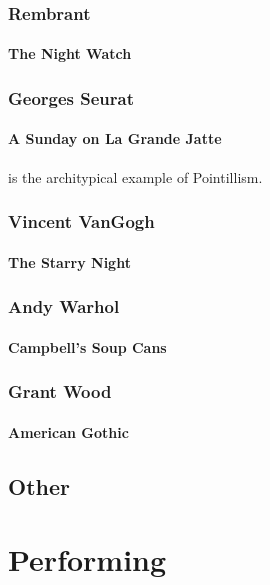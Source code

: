 			\subsubsection{Rembrant}
				\paragraph{The Night Watch}

			\subsubsection{Georges Seurat}
				\paragraph{A Sunday on La Grande Jatte} is the architypical example of Pointillism. 
			\subsubsection{Vincent VanGogh}
				\paragraph{The Starry Night}
			\subsubsection{Andy Warhol}
				\paragraph{Campbell's Soup Cans}
			\subsubsection{Grant Wood}
				\paragraph{American Gothic}
				




			
			
		\subsection{Other}

	\section{Performing}
